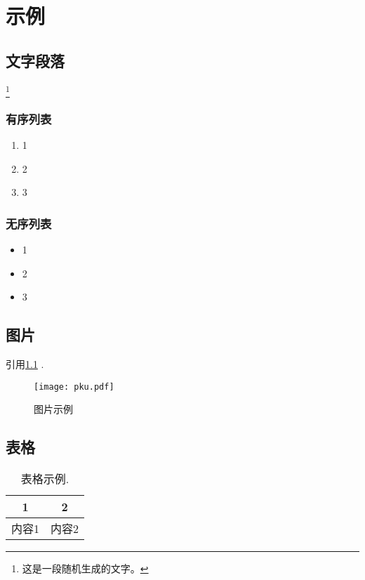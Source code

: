 \chapter{示例}

\thispagestyle{fancy}


\section{文字段落}


\lipsum[1]\footnote{这是一段随机生成的文字。}

\subsection{有序列表}

\begin{enumerate}
    \item 1
    \item 2
    \item 3
\end{enumerate}

\subsection{无序列表}

\begin{itemize}
    \item 1
    \item 2
    \item 3
\end{itemize}


\section{图片}

引用\cref{fig:1} .

\begin{figure}[htp]
	\centering
	\texttt{[image: pku.pdf]}
	\caption{图片示例}
	\label{fig:1}
\end{figure}

\section{表格}


\begin{table}[htp]
	\centering
	\caption{表格示例.}
	\begin{tabular}{cc}
		\toprule  1 & 2  \\
        \midrule
		内容1 & 内容2\\
		\bottomrule
	\end{tabular}
	\label{tab:1}
\end{table}

